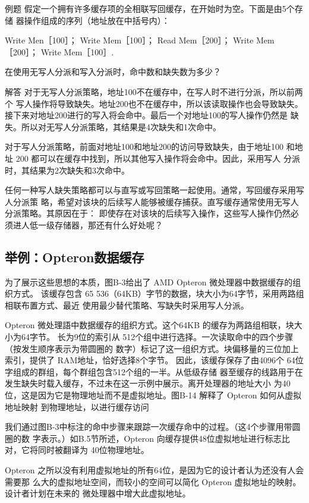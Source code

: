 例题
假定一个拥有许多缓存项的全相联写回缓存，在开始时为空。下面是由5个存储
器操作组成的序列（地址放在中括号内）：

Write Men［100］；
Write
Mem［100］；
Read
Mem［200］；
Write
Mem［200］；
Write Mem［100］.

在使用无写人分派和写入分派时，命中数和缺失数为多少？

解答
对于无写人分派策略，地址100不在缓存中，在写人时不进行分派，所以前两个
写人操作将导致缺失。地址200也不在缓存中，所以该读取操作也会导致缺失。
接下来对地址200进行的写入将会命中。最后一个对地址100的写人操作仍然是
缺失。所以对无写人分派策略，其结果是4次缺失和1次命中。

对于写人分派策略，前面对地址100和地址200的访问导致缺失，由于地址100
和地址 200 都可以在缓存中找到，所以其他写入操作将会命中。因此，采用写人
分派时，其结果为2次缺失和3次命中。

任何一种写人缺失策略都可以与直写或写回策略一起使用。通常，写回缓存采用写人分派策
略，希望对该块的后续写人能够被缓存捕获。直写缓存通常使用无写人分派策略。其原因在于：
即使存在对该块的后续写入操作，这些写人操作仍然必须进人低一级存储器，那还有什么好处呢？

\subsection{举例：Opteron数据缓存}

为了展示这些思想的本质，图B-3给出了 AMD Opteron 微处理器中数据缓存的组织方式。
该缓存包含 65 536（64KB）字节的数据，块大小为64字节，采用两路组相联布置方式、最近
使用最少替代策略、写缺失时采用写人分派。

Opteron 微处理語中数据缓存的组织方式。这个64KB 的缓存为两路组相联，块大小为64字节。
长为9位的索引从 512个组中进行选择。一次读取命中的四个步骤（按发生顺序表示为带圆圈的
数字）标记了这一组织方式。块偏移量的三位加上索引，提供了 RAM地址，恰好选择8个字节。
因此，该缓存保存了由4096个 64位字组成的群组，每个群组包含512个组的一半。从低级存储
器至缓存的线路用于在发生缺失时载入缓存，不过未在这一示例中展示。离开处理器的地址大小
为40位，这是因为它是物理地址而不是虚拟地址。图B-14 解释了 Opteron 如何从虚拟地址映射
到物理地址，以进行缓存访问

我们通过图B-3中标注的命中步骤来跟踪一次缓存命中的过程。（这4个步骤用带圆圈的数
字表示。）如B.5节所述，Opteron 向缓存提供48位虚拟地址进行标志比对，它将同时被翻译为
40位物理地址。

Opteron 之所以没有利用虚拟地址的所有64位，是因为它的设计者认为还没有人会需要那
么大的虚拟地址空间，而较小的空间可以简化 Opteron 虚拟地址的映射。设计者计划在未来的
微处理器中增大此虚拟地址。

